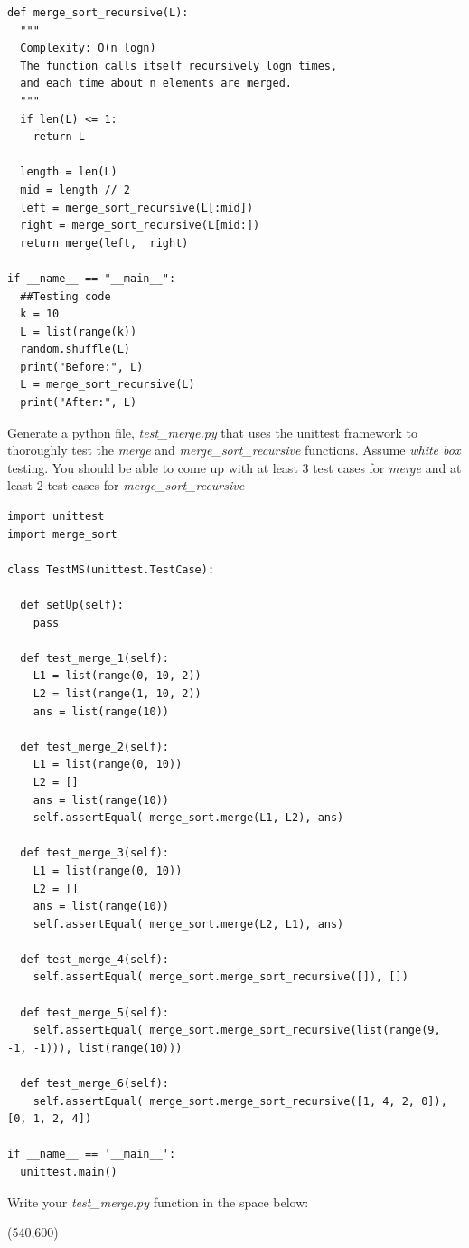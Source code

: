 \documentclass[10pt]{article}
\begin{document}
\begin{enumerate}
\begin{verbatim}
def merge_sort_recursive(L):
  """ 
  Complexity: O(n logn)
  The function calls itself recursively logn times,
  and each time about n elements are merged.
  """
  if len(L) <= 1:
    return L

  length = len(L)
  mid = length // 2
  left = merge_sort_recursive(L[:mid])
  right = merge_sort_recursive(L[mid:])
  return merge(left,  right)

if __name__ == "__main__":
  ##Testing code
  k = 10
  L = list(range(k))
  random.shuffle(L)
  print("Before:", L)
  L = merge_sort_recursive(L)
  print("After:", L)
\end{verbatim}

\newpage

Generate a python file, \textit{test\_merge.py} that uses the unittest framework to thoroughly test the \textit{merge} and \textit{merge\_sort\_recursive} functions. 
Assume \textit{white box} testing. 
You should be able to come up with at least 3 test cases for \textit{merge} and at least 2 test cases for \textit{merge\_sort\_recursive}
\beginanswers
\begin{verbatim}
import unittest
import merge_sort

class TestMS(unittest.TestCase):

  def setUp(self):
    pass

  def test_merge_1(self):
    L1 = list(range(0, 10, 2))
    L2 = list(range(1, 10, 2))
    ans = list(range(10))

  def test_merge_2(self):
    L1 = list(range(0, 10))
    L2 = []
    ans = list(range(10))
    self.assertEqual( merge_sort.merge(L1, L2), ans)

  def test_merge_3(self):
    L1 = list(range(0, 10))
    L2 = []
    ans = list(range(10))
    self.assertEqual( merge_sort.merge(L2, L1), ans)

  def test_merge_4(self):
    self.assertEqual( merge_sort.merge_sort_recursive([]), [])

  def test_merge_5(self):
    self.assertEqual( merge_sort.merge_sort_recursive(list(range(9, -1, -1))), list(range(10)))

  def test_merge_6(self):
    self.assertEqual( merge_sort.merge_sort_recursive([1, 4, 2, 0]), [0, 1, 2, 4])

if __name__ == '__main__':
  unittest.main()
\end{verbatim}
\else
Write your \textit{test\_merge.py} function in the space below:

\hspace*{-0.4in}\framebox(540,600){}
\fi


\end{enumerate}
\end{document}
